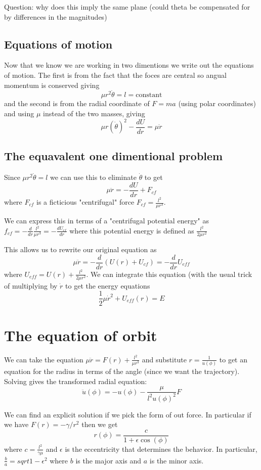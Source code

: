 \documentclass{homework}
\begin{document}
Question: why does this imply the same plane (could theta be compensated for by differences in the magnitudes)


\subsection{Equations of motion}

Now that we know we are working in two dimentions we write out the equations of motion. The first is from the fact that the foces are central so angual momentum is conserved giving
\[\mu r^2\dot{\theta} = l = \text{constant}\]
and the second is from the radial coordinate of $F  = ma$ (using polar coordinates) and using $\mu$ instead of the two masses, giving
\[\mu r(\dot{\theta})^2 - \frac{dU}{dr} = \mu\ddot{r}\]

\subsection{The equavalent one dimentional problem}

Since $\mu r^2\dot{\theta} = l$ we can use this to eliminate $\dot{\theta}$ to get
\[\mu\ddot{r} =- \frac{dU}{dr} + F_{cf} \]
where $F_{cf}$ is a ficticious "centrifugal" force $F_{cf} = \frac{l^2}{\mu r^3}$. 



We can express this in terms of a "centrifugal potential energy" as $f_{cf} = -\frac{d}{dr}\frac{l^2}{\mu r^3} = -\frac{dU_{cf}}{dr}$ where this potential energy is defined as $\frac{l^2}{2\mu r^2}$

This allows us to rewrite our original equation as 
\[\mu \ddot{r} = -\frac{d}{dr}(U(r) + U_{cf}) = -\frac{d}{dr}U_{eff}\]
where $U_{eff} = U(r) + \frac{l^2}{2\mu r^2}$. We can integrate this equation (with the usual trick of multiplying by $\dot{r}$ to get the energy equations
\[\frac{1}{2}\mu\dot{r}^2 + U_{eff}(r) = E\]


\section{The equation of orbit}

We can take the equation $\mu \ddot{r} = F(r) + \frac{l^2}{\mu r^3}$ and substitute $r = \frac{1}{u(\phi)}$ to get an equation for the radius in terms of the angle (since we want the trajectory). Solving gives the transformed radial equation:
\[\ddot{u}(\phi) = -u(\phi)-\frac{\mu}{l^2 u(\phi)^2}F\]

We can find an explicit solution if we pick the form of out force. In particular if we have $F(r) = -\gamma/r^2$ then we get
\[r(\phi) = \frac{c}{1 + \epsilon \cos(\phi)}\]
where $c = \frac{l^2}{\gamma \mu}$ and $\epsilon$ is the eccentricity that determines the behavior. In particular, $\frac{b}{a} = sqrt{1 - \epsilon^2}$ where $b$ is the major axis and $a$ is the minor axis.
\end{document}
